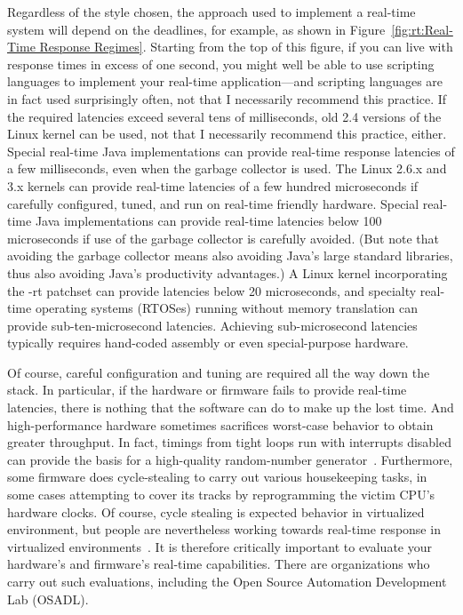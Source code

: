 Regardless of the style chosen, the approach used to implement a real-time
system will depend on the deadlines, for example, as shown in
Figure~\ref{fig:rt:Real-Time Response Regimes}.
Starting from the top of this figure, if you can live with response times in
excess of one second, you might well be able to use scripting languages
to implement your real-time application---and scripting languages are
in fact used surprisingly often, not that I necessarily recommend this
practice.
If the required latencies exceed several tens of milliseconds,
old 2.4 versions of the Linux kernel can be used, not that I necessarily
recommend this practice, either.
Special real-time Java implementations can provide real-time response
latencies of a few milliseconds, even when the garbage collector is
used.
The Linux 2.6.x and 3.x kernels can provide real-time latencies of
a few hundred microseconds if carefully configured, tuned, and run
on real-time friendly hardware.
Special real-time Java implementations can provide real-time latencies
below 100 microseconds if use of the garbage collector is carefully avoided.
(But note that avoiding the garbage collector means also avoiding
Java's large standard libraries, thus also avoiding Java's productivity
advantages.)
A Linux kernel incorporating the -rt patchset can provide latencies
below 20 microseconds, and specialty real-time operating systems (RTOSes)
running without memory translation can provide sub-ten-microsecond
latencies.
Achieving sub-microsecond latencies typically requires hand-coded assembly
or even special-purpose hardware.

Of course, careful configuration and tuning are required all the way down
the stack.
In particular, if the hardware or firmware fails to provide real-time
latencies, there is nothing that the software can do to make up the
lost time.
And high-performance hardware sometimes sacrifices worst-case behavior
to obtain greater throughput.
In fact, timings from tight loops run with interrupts disabled can
provide the basis for a high-quality random-number
generator~\cite{PeterOkech2009InherentRandomness}.
Furthermore, some firmware does cycle-stealing to carry out various
housekeeping tasks, in some cases attempting to cover its tracks by
reprogramming the victim CPU's hardware clocks.
Of course, cycle stealing is expected behavior in virtualized
environment, but people are nevertheless working towards real-time
response in virtualized
environments~\cite{ThomasGleixner2012KVMrealtime,JanKiszka2014virtRT}.
It is therefore critically important to evaluate your hardware's and
firmware's real-time capabilities.
There are organizations who carry out such evaluations, including
the Open Source Automation Development Lab (OSADL).


